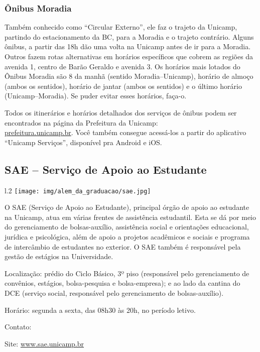 \subsubsection{Ônibus Moradia}
Também conhecido como ``Circular Externo'', ele faz o trajeto da Unicamp,
partindo do estacionamento da BC, para a Moradia e o trajeto contrário. Alguns
ônibus, a partir das 18h dão uma volta na Unicamp antes de ir para a Moradia.
Outros fazem rotas alternativas em horários específicos que cobrem as regiões
da avenida 1, centro de Barão Geraldo e avenida 3. Os horários mais lotados do
Ônibus Moradia são 8 da manhã (sentido Moradia--Unicamp), horário de almoço
(ambos os sentidos), horário de jantar (ambos os sentidos) e o último horário
(Unicamp--Moradia). Se puder evitar esses horários, faça-o.

Todos os itinerários e horários detalhados dos serviços de ônibus podem ser
encontrados na página da Prefeitura da Unicamp: \\\url{prefeitura.unicamp.br}.
Você também consegue acessá-los a partir do aplicativo ``Unicamp Serviços'',
disponível pra Android e iOS.

\subsection{SAE -- Serviço de Apoio ao Estudante}

\begin{wrapfigure}{l}{.2\textwidth}
  \centering
  \texttt{[image: img/alem\_da\_graduacao/sae.jpg]}
\end{wrapfigure}

O SAE (Serviço de Apoio ao Estudante), principal órgão de apoio ao estudante na
Unicamp, atua em várias frentes de assistência estudantil. Esta se dá por meio
do gerenciamento de bolsas-auxílio, assistência social e orientações
educacional, jurídica e psicológica, além de apoio a projetos acadêmicos e
sociais e programa de intercâmbio de estudantes no exterior. O SAE também é
responsável pela gestão de estágios na Universidade.

\begin{compactitemize}
\item Localização: prédio do Ciclo Básico, 3º piso (responsável pelo
  gerenciamento de convênios, estágios, bolsa-pesquisa e bolsa-empresa); e ao
  lado da cantina do DCE (serviço social, responsável pelo gerenciamento de
  bolsas-auxílio).
\item Horário: segunda a sexta, das 08h30 às 20h, no período letivo.
\item Contato: 
\item Site: \url{www.sae.unicamp.br}
\end{compactitemize}

